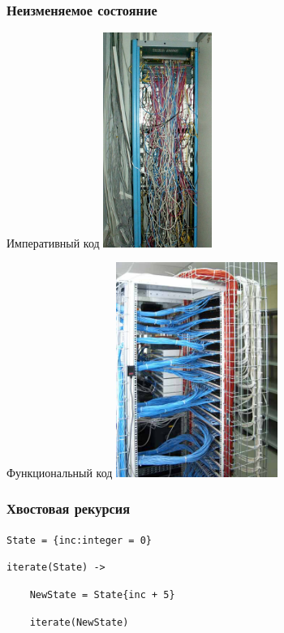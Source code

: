 \documentclass{beamer}
\begin{document}
\begin{frame}
  \frametitle{Неизменяемое состояние}
  \begin{minipage}[t]{90px}
    Императивный код
    \includegraphics[height=7cm]{nag_08.png}
  \end{minipage}
  \pause
  \hfill
  \begin{minipage}[t]{140px}
    Функциональный код\hfill
    \includegraphics[height=7cm]{sks_ok.png}
  \end{minipage}
\end{frame}


\begin{frame}[fragile]
  \frametitle{Хвостовая рекурсия}
  \begin{block}{}
    \texttt{State = \{inc:{\color{magenta}integer} = 0\}}
    \pause

    \texttt{{\color{blue}iterate}(State) ->}

    \verb+    +\texttt{NewState = State\{inc + 5\}}

    \verb+    +\texttt{{\color{blue}iterate}(NewState)}
  \end{block}

\end{frame}
\end{document}
